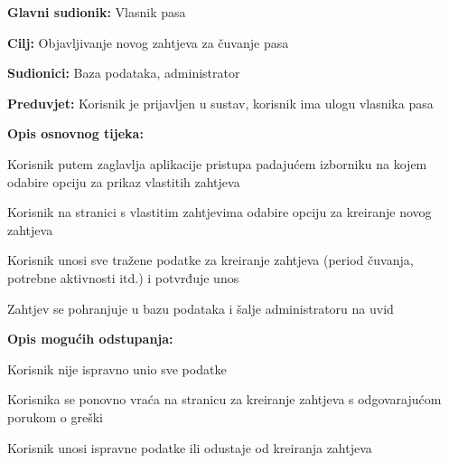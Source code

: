 					\noindent {}
					\begin{packed_item}
						
						\item \textbf{Glavni sudionik: } Vlasnik pasa
						\item  \textbf{Cilj:} Objavljivanje novog zahtjeva za čuvanje pasa
						\item  \textbf{Sudionici:} Baza podataka, administrator
						\item  \textbf{Preduvjet:} Korisnik je prijavljen u sustav, korisnik ima ulogu vlasnika pasa
						\item  \textbf{Opis osnovnog tijeka:}
						
						\item[] \begin{packed_enum}
							\item Korisnik putem zaglavlja aplikacije pristupa padajućem izborniku na kojem odabire opciju za prikaz vlastitih zahtjeva
							\item Korisnik na stranici s vlastitim zahtjevima odabire opciju za kreiranje novog zahtjeva
							\item Korisnik unosi sve tražene podatke za kreiranje zahtjeva (period čuvanja, potrebne aktivnosti itd.) i potvrđuje unos
							\item Zahtjev se pohranjuje u bazu podataka i šalje administratoru na uvid
							
						\end{packed_enum}
						
						\item  \textbf{Opis mogućih odstupanja:}
						
						\item[] \begin{packed_item}
							
							\item[3.a] Korisnik nije ispravno unio sve podatke
							\item[] \begin{packed_enum}
								
								\item Korisnika se ponovno vraća na stranicu za kreiranje zahtjeva s odgovarajućom porukom o greški
								\item Korisnik unosi ispravne podatke ili odustaje od kreiranja zahtjeva
								
							\end{packed_enum}
						\end{packed_item}
					\end{packed_item}		
				
